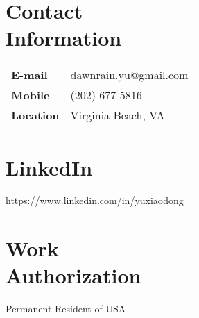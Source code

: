 \documentclass[margin,line]{resume}
\begin{document}
\begin{resume}

	\section{\mysidestyle Contact\\Information}
	\begin{tabular}{p{3.5cm}p{10cm}}
	\textbf{E-mail}       &  dawnrain.yu@gmail.com  \\ 
	\textbf{Mobile}       & (202) 677-5816  \\ 
	\textbf{Location}       & Virginia Beach, VA  \\ 
	\end{tabular}


    \section{\mysidestyle LinkedIn}
    https://www.linkedin.com/in/yuxiaodong 
    \vspace{3mm}

     \section{\mysidestyle Work \\ Authorization}
    Permanent Resident of USA
    \vspace{3mm}
   

\end{resume}
\end{document}
